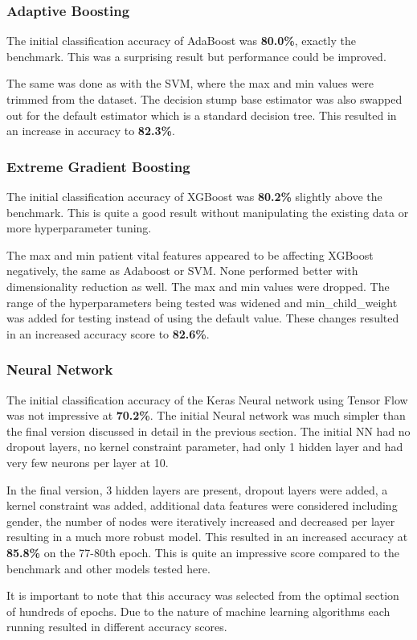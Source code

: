 \documentclass[11pt]{article}
\begin{document}
	\subsubsection{Adaptive Boosting}
	The initial classification accuracy of AdaBoost was \textbf{80.0\%}, exactly the benchmark. This was a surprising result but performance could be improved.
	
	The same was done as with the SVM, where the max and min values were trimmed from the dataset. The decision stump base estimator was also swapped out for the default estimator which is a standard decision tree. This resulted in an increase in accuracy to \textbf{82.3\%}. 
	
	\subsubsection{Extreme Gradient Boosting}
	The initial classification accuracy of XGBoost was \textbf{80.2\%} slightly above the benchmark. This is quite a good result without manipulating the existing data or more hyperparameter tuning.
	
	The max and min patient vital features appeared to be affecting XGBoost negatively, the same as Adaboost or SVM. None performed better with dimensionality reduction as well. The max and min values were dropped. The range of the hyperparameters being tested was widened and min\_child\_weight was added for testing instead of using the default value. These changes resulted in an increased accuracy score to \textbf{82.6\%}. 
	
	\subsubsection{Neural Network}
	The initial classification accuracy of the Keras Neural network using Tensor Flow was not impressive at \textbf{70.2\%}. The initial Neural network was much simpler than the final version discussed in detail in the previous section. The initial NN had no dropout layers, no kernel constraint parameter, had only 1 hidden layer and had very few neurons per layer at 10.
	
	In the final version, 3 hidden layers are present, dropout layers were added, a kernel constraint was added, additional data features were considered including gender, the number of nodes were iteratively increased and decreased per layer resulting in a much more robust model. This resulted in an increased accuracy at \textbf{85.8\%} on the 77-80th epoch. This is quite an impressive score compared to the benchmark and other models tested here.
	
	It is important to note that this accuracy was selected from the optimal section of hundreds of epochs. Due to the nature of machine learning algorithms each running resulted in different accuracy scores.
	
	{}
	
	
\end{document}
